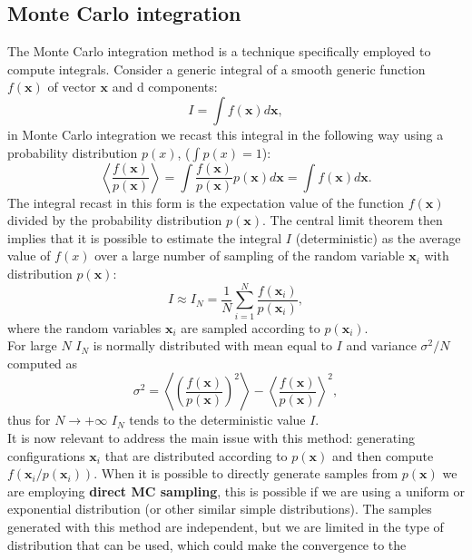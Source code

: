 \subsection{Monte Carlo integration}
The Monte Carlo integration method is a technique specifically employed to compute integrals. Consider a generic integral of a smooth generic function 
$f(\mathbf{x})$ of vector $\mathbf{x}$ and d components:
\begin{equation}
    I=\int f(\mathbf{x})d\mathbf{x},
\end{equation}
in Monte Carlo integration we recast this integral in the following way using a probability distribution $p(x)$, ($\int p(x)=1$):
\begin{equation}
    \left\langle \frac{f(\mathbf{x})}{p(\mathbf{x})}\right\rangle =\int\frac{f(\mathbf{x})}{p(\mathbf{x})}p(\mathbf{x})d\mathbf{x} = \int f(\mathbf{x})d\mathbf{x}.
\end{equation}
The integral recast in this form is the expectation value of the function $f(\mathbf{x})$ divided by the probability distribution $p(\mathbf{x})$. 
The central limit theorem then implies that it is possible to estimate the integral $I$ (deterministic) as the average value of $f(x)$ over a large number of
sampling of the random variable $\mathbf{x}_i$ with distribution $p(\mathbf{x})$:
\begin{equation}
    I\approx I_N=\frac{1}{N}\sum_{i=1}^N\frac{f(\mathbf{x}_i)}{p(\mathbf{x}_i)},
\end{equation}
where the random variables $\mathbf{x}_i$ are sampled according to $p(\mathbf{x}_i)$.\\
For large $N$ $I_N$ is normally distributed with mean equal to $I$ and variance $\sigma^2/N$ computed as 
\begin{equation}
    \sigma^2=\left \langle \left(\frac{ f(\mathbf{x})}{p(\mathbf{x})}\right)^2  \right\rangle-\left\langle \frac{f(\mathbf{x})}{p(\mathbf{x})} \right\rangle^2,
\end{equation}
thus for $N\to+\infty$ $I_N$ tends to the deterministic value $I$.\\
It is now relevant to address the main issue with this method: generating configurations $\mathbf{x}_i$ that are distributed according to 
$p(\mathbf{x})$ and then compute $f(\mathbf{x}_i/p(\mathbf{x}_i))$. When it is possible to directly generate samples from $p(\mathbf{x})$ 
we are employing \textbf{direct MC sampling}, this is possible if we are using a uniform or exponential distribution (or other similar simple distributions).
The samples generated with this method are independent, but we are limited in the type of distribution that can be used, which could make the convergence to the 
